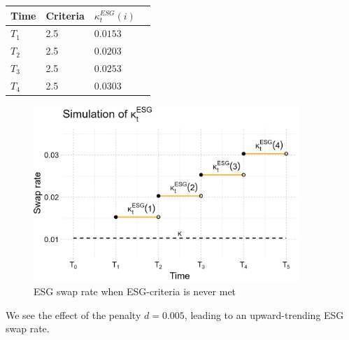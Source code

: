 \begin{center}
    \begin{tabular}{ | l | l | l | p{5cm} |}
    \hline
    Time    & Criteria  & $\kappa_{t}^{ESG}(i)$ \\ \hline
    $T_{1}$ &    2.5    & $0.0153$  \\ \hline
    $T_{2}$ &    2.5    & $0.0203$  \\ \hline
    $T_{3}$ &    2.5    & $0.0253$\\ \hline
    $T_{4}$ &    2.5    & $0.0303$ \\ \hline
    \end{tabular}
\end{center} 


\begin{figure}[htp]
    \centering
    \includegraphics[width=10cm]{figures/ESG/kappa_t_ESG_3.png}
    \caption{ESG swap rate when ESG-criteria is never met}
    \label{fig: ESG_swap_3}
\end{figure} 

We see the effect of the penalty $d = 0.005$, leading to an upward-trending ESG swap rate. 










